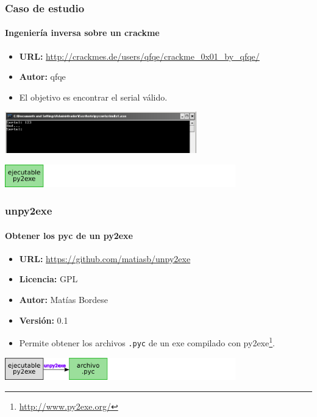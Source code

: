 \documentclass[9pt, notes=hide]{beamer}
\begin{document}
    \begin{frame}
        \frametitle{Caso de estudio}
        \framesubtitle{Ingeniería inversa sobre un crackme}

        \begin{itemize}
            \item \textbf{URL:} \url{http://crackmes.de/users/qfqe/crackme_0x01_by_qfqe/}
            \item \textbf{Autor:} qfqe
            \item El objetivo es encontrar el serial válido.
        \end{itemize}

        \begin{center}
            \includegraphics[height=1.8cm]{images/crackme1.png}
        \end{center}

        \begin{center}
            \includegraphics[width=10cm]{images/pipe-1.png}
        \end{center}

    \end{frame}

    \begin{frame}
        \frametitle{unpy2exe}
        \framesubtitle{Obtener los pyc de un py2exe}

        \begin{itemize}
            \item \textbf{URL:} \url{https://github.com/matiasb/unpy2exe}
            \item \textbf{Licencia:} GPL
            \item \textbf{Autor:} Matías Bordese
            \item \textbf{Versión:} 0.1
            \item Permite obtener los archivos \texttt{.pyc} de un exe compilado con py2exe\footnote{\url{http://www.py2exe.org/}}.
        \end{itemize}

        \vspace{1cm}
        \begin{center}
            \includegraphics[width=10cm]{images/pipe-2.png}
        \end{center}

    \end{frame}
\end{document}
